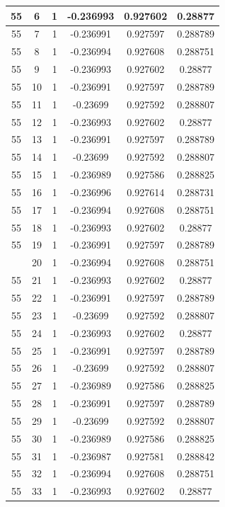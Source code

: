 \documentclass[12pt,a4paper]{article}
\numberwithin{equation}{section}
\numberwithin{figure}{section}
\numberwithin{table}{section}
\begin{document}
\begin{longtable}{|c|c|c|c|c|c|}
55 & 6 & 1 & -0.236993 & 0.927602 & 0.28877 \\ \hline
55 & 7 & 1 & -0.236991 & 0.927597 & 0.288789 \\ \hline
55 & 8 & 1 & -0.236994 & 0.927608 & 0.288751 \\ \hline
55 & 9 & 1 & -0.236993 & 0.927602 & 0.28877 \\ \hline
55 & 10 & 1 & -0.236991 & 0.927597 & 0.288789 \\ \hline
55 & 11 & 1 & -0.23699 & 0.927592 & 0.288807 \\ \hline
55 & 12 & 1 & -0.236993 & 0.927602 & 0.28877 \\ \hline
55 & 13 & 1 & -0.236991 & 0.927597 & 0.288789 \\ \hline
55 & 14 & 1 & -0.23699 & 0.927592 & 0.288807 \\ \hline
55 & 15 & 1 & -0.236989 & 0.927586 & 0.288825 \\ \hline
55 & 16 & 1 & -0.236996 & 0.927614 & 0.288731 \\ \hline
55 & 17 & 1 & -0.236994 & 0.927608 & 0.288751 \\ \hline
55 & 18 & 1 & -0.236993 & 0.927602 & 0.28877 \\ \hline
55 & 19 & 1 & -0.236991 & 0.927597 & 0.288789 \\ \hline
\pagebreak
55 & 20 & 1 & -0.236994 & 0.927608 & 0.288751 \\ \hline
55 & 21 & 1 & -0.236993 & 0.927602 & 0.28877 \\ \hline
55 & 22 & 1 & -0.236991 & 0.927597 & 0.288789 \\ \hline
55 & 23 & 1 & -0.23699 & 0.927592 & 0.288807 \\ \hline
55 & 24 & 1 & -0.236993 & 0.927602 & 0.28877 \\ \hline
55 & 25 & 1 & -0.236991 & 0.927597 & 0.288789 \\ \hline
55 & 26 & 1 & -0.23699 & 0.927592 & 0.288807 \\ \hline
55 & 27 & 1 & -0.236989 & 0.927586 & 0.288825 \\ \hline
55 & 28 & 1 & -0.236991 & 0.927597 & 0.288789 \\ \hline
55 & 29 & 1 & -0.23699 & 0.927592 & 0.288807 \\ \hline
55 & 30 & 1 & -0.236989 & 0.927586 & 0.288825 \\ \hline
55 & 31 & 1 & -0.236987 & 0.927581 & 0.288842 \\ \hline
55 & 32 & 1 & -0.236994 & 0.927608 & 0.288751 \\ \hline
55 & 33 & 1 & -0.236993 & 0.927602 & 0.28877 \\ \hline

\end{longtable}
\end{document}
